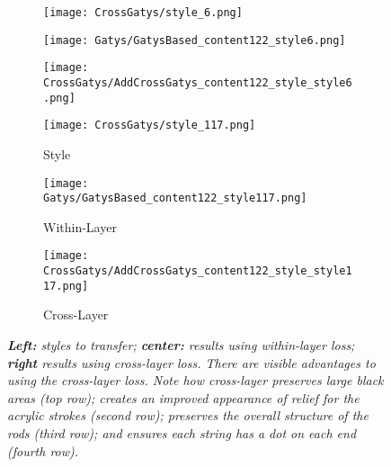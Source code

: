 \documentclass[runningheads]{llncs}
\begin{document}
\begin{figure}[!htbp]
  \begin{subfigure}[b]{0.3\linewidth}
    \texttt{[image: CrossGatys/style\_6.png]}
  \end{subfigure}
  \begin{subfigure}[b]{0.3\linewidth}
    \texttt{[image: Gatys/GatysBased\_content122\_style6.png]}
  \end{subfigure}
  \begin{subfigure}[b]{0.3\linewidth}
    \texttt{[image: CrossGatys/AddCrossGatys\_content122\_style\_style6.png]}
  \end{subfigure}
  \begin{subfigure}[b]{0.3\linewidth}
    \texttt{[image: CrossGatys/style\_117.png]}
\caption{Style}
  \end{subfigure}
  \begin{subfigure}[b]{0.3\linewidth}
    \texttt{[image: Gatys/GatysBased\_content122\_style117.png]}
\caption{Within-Layer}
  \end{subfigure}
  \begin{subfigure}[b]{0.3\linewidth}
    \texttt{[image: CrossGatys/AddCrossGatys\_content122\_style\_style117.png]}
\caption{Cross-Layer}
  \end{subfigure}  
  \caption{\em {\bf Left:} styles to transfer; {\bf center:} results using within-layer
    loss; {\bf right} results using cross-layer loss.  There are
    visible advantages to using the cross-layer loss. Note how cross-layer preserves large black areas (top row); 
creates an improved appearance of relief for the acrylic strokes (second row); preserves the overall structure of the
rods (third row); and ensures each string has a dot on each end (fourth row).
  }\label{fig:cf1}
\end{figure}
\end{document}
